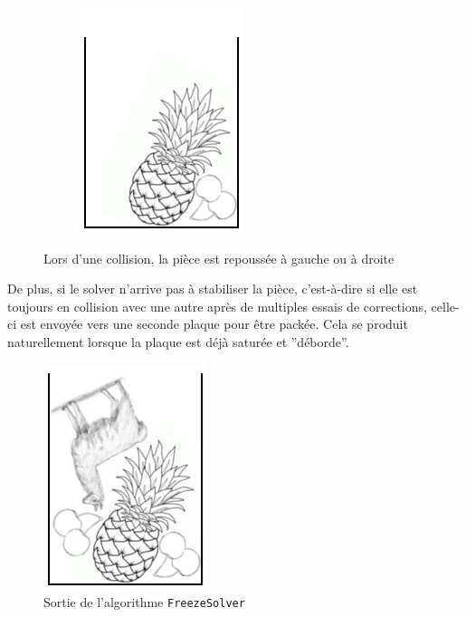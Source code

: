 \begin{figure}[!htb]
\begin{subfigure}{.30\linewidth}
        \includegraphics[width=\linewidth]{img/FreezeE.png}
    \end{subfigure}
    
    \caption{Lors d'une collision, la pièce est repoussée à gauche ou à droite}
    \label{fig:FreezeCD}
\end{figure}

\newpage
\indent De plus, si le solver n'arrive pas à stabiliser la pièce, c'est-à-dire si elle est toujours en collision avec une autre après de multiples essais de corrections, celle-ci est envoyée vers une seconde plaque pour être packée. Cela se produit naturellement lorsque la plaque est déjà saturée et ''déborde''.

\begin{figure}[!htb]
\centering
\includegraphics[scale=1]{img/FreezeG.png}
\caption{Sortie de l'algorithme \texttt{FreezeSolver}}
\label{fig:FreezeSolver}
\end{figure}




